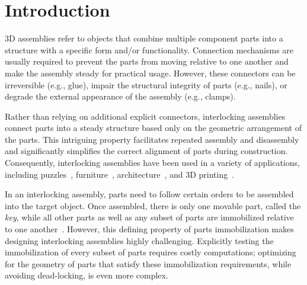 

\section{Introduction}
\label{sec:introduction}

3D assemblies refer to objects that combine multiple component parts into a structure with a specific form and/or functionality.  Connection mechanisms are usually required to prevent the parts from moving relative to one another and make the assembly steady for practical usage.
However, these connectors can be irreversible (e.g., glue), impair the structural integrity of parts (e.g., nails), or degrade the external appearance of the assembly (e.g., clamps).

Rather than relying on additional explicit connectors, interlocking assemblies connect parts into a steady structure  based only on the geometric arrangement of the parts. This intriguing property facilitates repeated assembly and disassembly and significantly simplifies the correct alignment of parts during construction.
Consequently, interlocking assemblies have been used in a variety of applications, including puzzles~\cite{Stegmann-2018-PuzzlePage}, furniture~\cite{Fu-2015-Furniture}, architecture~\cite{Deepak-2012-InterlockBlock}, and 3D printing~\cite{Yao-2017-InterlockShell}.

In an interlocking assembly, parts need to follow certain orders to be assembled into the target object.
Once assembled, there is only one movable part, called the {\em key},  while all other parts as well as any subset of  parts are immobilized relative to one another~\cite{Song-2012-InterCubes}.
However, this defining property of parts immobilization makes designing interlocking assemblies highly challenging. Explicitly testing the immobilization of every subset of parts requires costly computations; optimizing for the geometry of parts that satisfy these immobilization requirements, while avoiding dead-locking, is even more complex.

